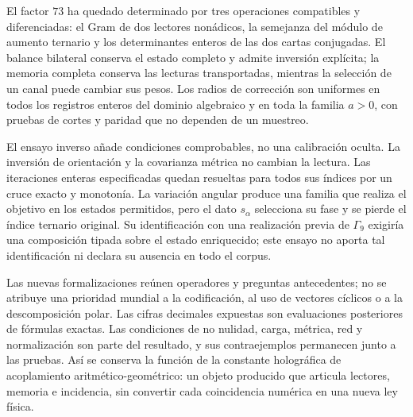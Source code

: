 El factor \(73\) ha quedado determinado por tres operaciones
compatibles y diferenciadas: el Gram de dos lectores nonádicos, la
semejanza del módulo de aumento ternario y los determinantes enteros de
las dos cartas conjugadas. El balance bilateral conserva el estado
completo y admite inversión explícita; la memoria completa conserva las
lecturas transportadas, mientras la selección de un canal puede cambiar
sus pesos. Los radios de corrección son uniformes en todos los registros
enteros del dominio algebraico y en toda la familia \(a>0\), con
pruebas de cortes y paridad que no dependen de un muestreo.

El ensayo inverso añade condiciones comprobables, no una calibración
oculta. La inversión de orientación y la covarianza métrica no cambian
la lectura. Las iteraciones enteras especificadas quedan resueltas para
todos sus índices por un cruce exacto y monotonía. La variación angular
produce una familia que realiza el objetivo en los estados permitidos,
pero el dato \(s_\alpha\) selecciona su fase y se pierde el índice
ternario original. Su identificación con una realización previa de
\(\Gamma_9\) exigiría una composición tipada sobre el estado
enriquecido; este ensayo no aporta tal identificación ni declara su
ausencia en todo el corpus.

Las nuevas formalizaciones reúnen operadores y preguntas antecedentes;
no se atribuye una prioridad mundial a la codificación, al uso de
vectores cíclicos o a la descomposición polar. Las cifras decimales
expuestas son evaluaciones posteriores de fórmulas exactas. Las
condiciones de no nulidad, carga, métrica, red y normalización son parte
del resultado, y sus contraejemplos permanecen junto a las pruebas.
Así se conserva la función de la constante holográfica de acoplamiento
aritmético-geométrico: un objeto producido que articula lectores, memoria
e incidencia, sin convertir cada coincidencia numérica en una nueva ley
física.
